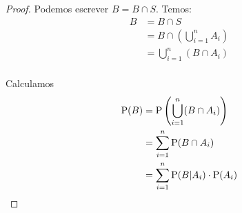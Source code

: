 \begin{proof}
    Podemos escrever $B = B \cap S$. Temos:
    \begin{align*}
        B &= B \cap S \\
        &= B \cap \left(\bigcup_{i=1}^n A_i\right) \\
        &= \bigcup_{i=1}^n (B \cap A_i) \\
    \end{align*}

    Calculamos
    \begin{align*}
        \operatorname{P}(B) &= \operatorname{P}\left(\bigcup_{i=1}^n (B \cap A_i)\right) \\
        &= \sum_{i=1}^n \operatorname{P}(B \cap A_i) \\
        &= \sum_{i=1}^n \operatorname{P}(B | A_i)\cdot\operatorname{P}(A_i)
    \end{align*}
\end{proof}

